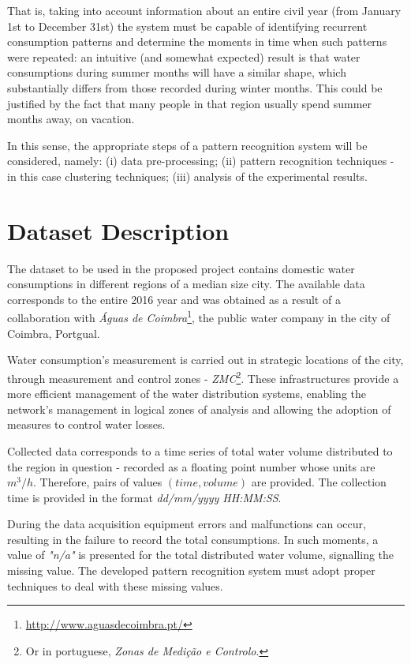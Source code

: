 \documentclass[9pt,journal,compsoc]{IEEEtran}
\begin{document}
That is, taking into account information about an entire civil year (from January 1st to December 31st) the system must be capable of identifying recurrent consumption patterns and determine the moments in time when such patterns were repeated: an intuitive (and somewhat expected) result is that water consumptions during summer months will have a similar shape, which substantially differs from those recorded during winter months. This could be justified by the fact that many people in that region usually spend summer months away, on vacation.

In this sense, the appropriate steps of a pattern recognition system will be considered, namely: (i) data pre-processing; (ii) pattern recognition techniques - in this case clustering techniques; (iii) analysis of the experimental results.

\section{Dataset Description}
\label{dataset_description}

The dataset to be used in the proposed project contains domestic water consumptions in different regions of a median size city. The available data corresponds to the entire 2016 year and was obtained as a result of a collaboration with \emph{Águas de Coimbra}\footnote{\url{http://www.aguasdecoimbra.pt/}}, the public water company in the city of Coimbra, Portgual.

Water consumption's measurement is carried out in strategic locations of the city, through measurement and control zones - \emph{ZMC}\footnote{Or in portuguese, \emph{Zonas de Medição e Controlo}.}. These infrastructures provide a more efficient management of the water distribution systems, enabling the network's management in logical zones of analysis and allowing the adoption of measures to control water losses.

Collected data corresponds to a time series of total water volume distributed to the region in question - recorded as a floating point number whose units are $m^{3}/h$. Therefore, pairs of values $(time, volume)$ are provided. The collection time is provided in the format \emph{dd/mm/yyyy HH:MM:SS}.

During the data acquisition equipment errors and malfunctions can occur, resulting in the failure to record the total consumptions. In such moments, a value of \emph{"n/a"} is presented for the total distributed water volume, signalling the missing value. The developed pattern recognition system must adopt proper techniques to deal with these missing values.
\end{document}
